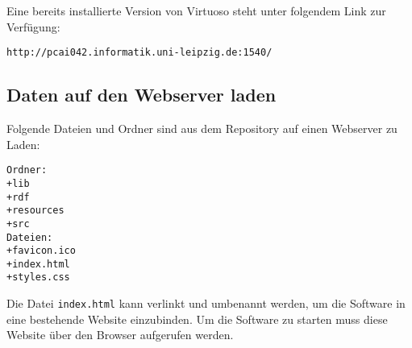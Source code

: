 \documentclass[11pt,a4paper]{article}
\begin{document}
Eine bereits installierte Version von Virtuoso steht unter folgendem Link zur Verfügung:
\begin{lstlisting}
http://pcai042.informatik.uni-leipzig.de:1540/
\end{lstlisting}
\subsection{Daten auf den Webserver laden}
Folgende Dateien und Ordner sind aus dem Repository auf einen Webserver zu Laden:
\begin{lstlisting}
Ordner:
+lib
+rdf
+resources
+src
Dateien:
+favicon.ico
+index.html
+styles.css
\end{lstlisting}
Die Datei \lstinline$index.html$ kann verlinkt und umbenannt werden, um die Software in eine bestehende Website einzubinden.
Um die Software zu starten muss diese Website über den Browser aufgerufen werden.
\end{document}
